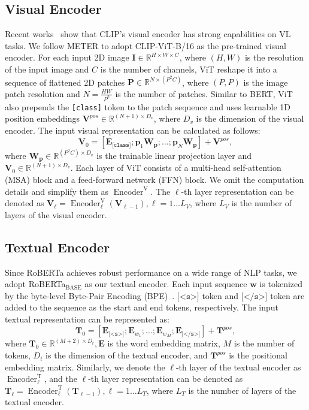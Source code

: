 \documentclass[letterpaper]{article} %
\begin{document}
\subsection{Visual Encoder}
Recent works~\citep{shen2021much, dou2021meter} show that CLIP's visual encoder has strong capabilities on VL tasks.
We follow METER to adopt CLIP-ViT-B/16 as the pre-trained visual encoder.
For each input 2D image $\mathbf{I} \in \mathbb{R}^{H \times W \times C}$, where $(H, W)$ is the resolution of the input image and $C$ is the number of channels, ViT reshape it into a sequence of flattened 2D patches $\mathbf{P} \in \mathbb{R}^{N \times (P^2C)}$, where $(P, P)$ is the image patch resolution and $N=\frac{HW}{P^2}$ is the number of patches. 
Similar to BERT, ViT also prepends the \texttt{[class]} token to the patch sequence and uses learnable 1D position embeddings $\mathbf{V}^{pos} \in \mathbb{R}^{(N+1) \times D_v}$, where $D_v$ is the dimension of the visual encoder. 
The input visual representation can be calculated as follows:
\begin{equation}
    \mathbf{V}_0=[\mathbf{E}_{\texttt{[class]}};\mathbf{p}_1 \mathbf{W_p};\dots;\mathbf{p}_N \mathbf{W_p}] + \mathbf{V}^{pos},
\end{equation}
where $\mathbf{W_p} \in \mathbb{R}^{(P^2C) \times D_v}$ is the trainable linear projection layer and $\mathbf{V}_0 \in \mathbb{R}^{(N+1) \times D_v}$.
Each layer of ViT consists of a multi-head self-attention (MSA) block and a feed-forward network (FFN) block. We omit the computation details and simplify them as $\operatorname{Encoder}^\mathrm{V}$. The $\ell$-th layer representation can be denoted as $\mathbf{V}_{\ell} = \operatorname{Encoder}^\mathrm{V}_\ell(\mathbf{V}_{\ell-1}), \ell = 1 \dots L_V$, where $L_V$ is the number of layers of the visual encoder.

\subsection{Textual Encoder}
Since RoBERTa achieves robust performance on a wide range of NLP tasks, we adopt RoBERTa$_{\text{BASE}}$ as our textual encoder. Each input sequence $\mathbf{w}$ is tokenized by the byte-level Byte-Pair Encoding (BPE)~\citep{sennrich-etal-2016-neural, radford2019language}. $\texttt{[<s>]}$ token and $\texttt{[</s>]}$ token are added to the sequence as the start and end tokens, respectively.
The input textual representation can be represented as:
\begin{equation}
    \mathbf{T}_0=[\mathbf{E}_{\texttt{[<s>]}};\mathbf{E}_{{w}_1};\dots;\mathbf{E}_{{w}_M};\mathbf{E}_{\texttt{[</s>]}}] + \mathbf{T}^{pos},
\end{equation}
where $\mathbf{T}_{0} \in \mathbb{R}^{(M+2) \times D_t},\mathbf{E}$ is the word embedding matrix, $M$ is the number of tokens, $D_t$ is the dimension of the textual encoder, and $\mathbf{T}^{pos}$ is the positional embedding matrix. 
Similarly, we denote the $\ell$-th layer of the textual encoder as $\operatorname{Encoder}^\mathrm{T}_\ell$, and the $\ell$-th layer representation can be denoted as $\mathbf{T}_{\ell} = \operatorname{Encoder}^\mathrm{T}_\ell(\mathbf{T}_{\ell-1}), \ell = 1 \dots L_T$, where $L_T$ is the number of layers of the textual encoder.
\end{document}
